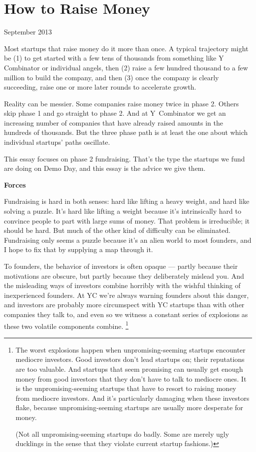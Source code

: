 \chapter{How to Raise Money}

September 2013

Most startups that raise money do it more than once. A typical
trajectory might be (1) to get started with a few tens of thousands from
something like Y Combinator or individual angels, then (2) raise a few
hundred thousand to a few million to build the company, and then (3)
once the company is clearly succeeding, raise one or more later rounds
to accelerate growth.

Reality can be messier. Some companies raise money twice in phase 2.
Others skip phase 1 and go straight to phase 2. And at Y~Combinator we
get an increasing number of companies that have already raised amounts
in the hundreds of thousands. But the three phase path is at least the
one about which individual startups' paths oscillate.

This essay focuses on phase 2 fundraising. That's the type the startups
we fund are doing on Demo Day, and this essay is the advice we give
them.

\textbf{Forces}

Fundraising is hard in both senses: hard like lifting a heavy weight,
and hard like solving a puzzle. It's hard like lifting a weight because
it's intrinsically hard to convince people to part with large sums of
money. That problem is irreducible; it should be hard. But much of the
other kind of difficulty can be eliminated. Fundraising only seems a
puzzle because it's an alien world to most founders, and I hope to fix
that by supplying a map through it.

To founders, the behavior of investors is often opaque --- partly
because their motivations are obscure, but partly because they
deliberately mislead you. And the misleading ways of investors combine
horribly with the wishful thinking of inexperienced founders. At YC
we're always warning founders about this danger, and investors are
probably more circumspect with YC startups than with other companies
they talk to, and even so we witness a constant series of explosions as
these two volatile components combine. \footnote{The worst explosions happen when unpromising-seeming startups
encounter mediocre investors. Good investors don't lead startups on;
their reputations are too valuable. And startups that seem promising can
usually get enough money from good investors that they don't have to
talk to mediocre ones. It is the unpromising-seeming startups that have
to resort to raising money from mediocre investors. And it's
particularly damaging when these investors flake, because
unpromising-seeming startups are usually more desperate for money.

(Not all unpromising-seeming startups do badly. Some are merely ugly
ducklings in the sense that they violate current startup fashions.)}

